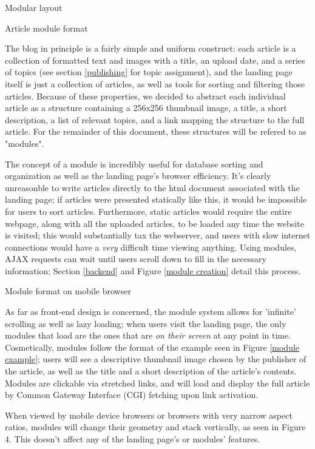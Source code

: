 Modular layout

Article module format

 The blog in principle is a fairly simple and uniform construct: each article is a collection of formatted text and images with a title, an upload date, and a series of topics (see section \ref{publishing} for topic assignment), and the landing page itself is just a collection of articles, as well as tools for sorting and filtering those articles. Because of these properties, we decided to abstract each individual article as a structure containing a 256x256 thumbnail image, a title, a short description, a list of relevant topics, and a link mapping the structure to the full article. For the remainder of this document, these structures will be refered to as "modules".

 The concept of a module is incredibly useful for database sorting and organization as well as the landing page's browser efficiency. It's clearly unreasonble to write articles directly to the html document associated with the landing page; if articles were presented statically like this, it would be impossible for users to sort articles. Furthermore, static articles would require the entire webpage, along with all the uploaded articles, to be loaded any time the website is visited; this would substantially tax the webserver, and users with slow internet connections would have a \textit{very} difficult time viewing anything. Using modules, AJAX requests can wait until users scroll down to fill in the necessary information; Section \ref{backend} and Figure \ref{module creation} detail this process.

Module format on mobile browser

As far as front-end design is concerned, the module system allows for 'infinite' scrolling as well as lazy loading; when users visit the landing page, the only modules that load are the ones that are \textit{on their screen} at any point in time. Cosmetically, modules follow the format of the example seen in Figure \ref{module example}; users will see a descriptive thumbnail image chosen by the publisher of the article, as well as the title and a short description of the article's contents. Modules are clickable via stretched links, and will load and display the full article by Common Gateway Interface (CGI) fetching upon link activation.

When viewed by mobile device browsers or browsers with very narrow aspect ratios, modules will change their geometry and stack vertically, as seen in Figure 4. This doesn't affect any of the landing page's or modules' features.

